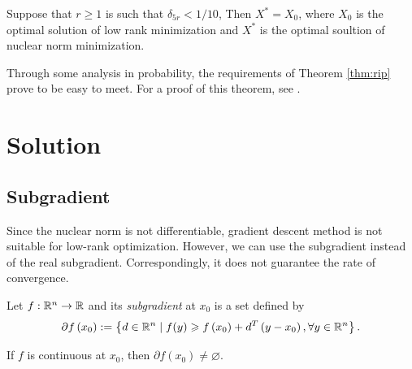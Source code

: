 \documentclass[11pt]{article}
\begin{document}
\begin{theorem}\label{thm:rip}
    Suppose that \(r \geqslant 1\) is such that \(\delta_{5r} < 1/10\), Then \(X^\ast = X_0\), where \(X_0\) is the optimal solution of low rank minimization and \(X^\ast\) is the optimal soultion of nuclear norm minimization.
\end{theorem} 

Through some analysis in probability, the requirements of Theorem \ref{thm:rip} prove to be easy to meet. For a proof of this theorem, see \cite{recht2010guaranteed}.

\section{Solution}

\subsection{Subgradient}

Since the nuclear norm is not differentiable, gradient descent method is not suitable for low-rank optimization. However, we can use the subgradient instead of the real subgradient. Correspondingly, it does not guarantee the rate of convergence.

\begin{definition}[Subgradient]
    Let \(f:\mathbb R^n \to \mathbb R\) and its \emph{subgradient} at \(x_0\) is a set defined by
    \[\partial f\left(x_0\right) := \left\{d \in \mathbb R^n \mid f(y)\geqslant f\left(x_0\right) + d^T \left(y-x_0\right),\forall y \in \mathbb R^n\right\}.\]
\end{definition}

\begin{remark}
    If \(f\) is continuous at \(x_0\), then \(\partial f(x_0) \neq \varnothing\).
\end{remark}
\end{document}
